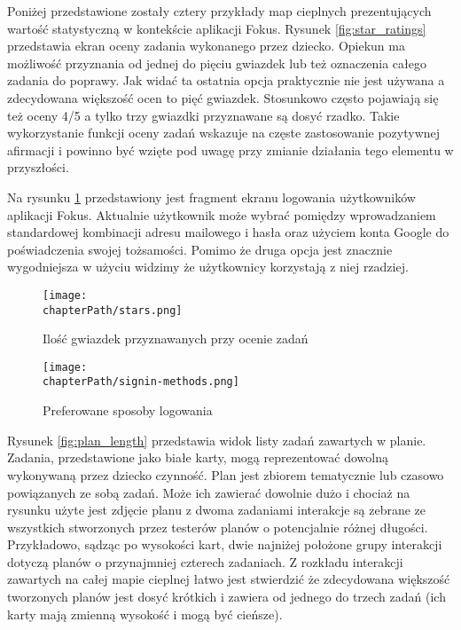Poniżej przedstawione zostały cztery przykłady map cieplnych prezentujących wartość statystyczną w kontekście aplikacji Fokus. Rysunek \ref{fig:star_ratings} przedstawia ekran oceny zadania wykonanego przez dziecko. Opiekun ma możliwość przyznania od jednej do pięciu gwiazdek lub też oznaczenia całego zadania do poprawy. Jak widać ta ostatnia opcja praktycznie nie jest używana a zdecydowana większość ocen to pięć gwiazdek. Stosunkowo często pojawiają się też oceny 4/5 a tylko trzy gwiazdki przyznawane są dosyć rzadko. Takie wykorzystanie funkcji oceny zadań wskazuje na częste zastosowanie pozytywnej afirmacji i powinno być wzięte pod uwagę przy zmianie działania tego elementu w przyszłości.

Na rysunku \ref{fig:signin_methods} przedstawiony jest fragment ekranu logowania użytkowników aplikacji Fokus. Aktualnie użytkownik może wybrać pomiędzy wprowadzaniem standardowej kombinacji adresu mailowego i hasła oraz użyciem konta Google do poświadczenia swojej tożsamości. Pomimo że druga opcja jest znacznie wygodniejsza w użyciu widzimy że użytkownicy korzystają z niej rzadziej.

\bigskip
\begin{figure}[H]
\centering
\begin{minipage}{.45\textwidth}
	\centering
	\texttt{[image: \\chapterPath/stars.png]}
	\bigskip
	\caption{Ilość gwiazdek przyznawanych przy ocenie zadań}
	\label{fig:star_ratings}
\end{minipage}
\begin{minipage}{.45\textwidth}
	\centering
	\texttt{[image: \\chapterPath/signin-methods.png]}
	\bigskip
	\caption{Preferowane sposoby logowania}
	\label{fig:signin_methods}
\end{minipage}
\end{figure}

Rysunek \ref{fig:plan_length} przedstawia widok listy zadań zawartych w planie. Zadania, przedstawione jako białe karty, mogą reprezentować dowolną wykonywaną przez dziecko czynność. Plan jest zbiorem tematycznie lub czasowo powiązanych ze sobą zadań. Może ich zawierać dowolnie dużo i chociaż na rysunku użyte jest zdjęcie planu z dwoma zadaniami interakcje są zebrane ze wszystkich stworzonych przez testerów planów o potencjalnie różnej długości. Przykładowo, sądząc po wysokości kart, dwie najniżej położone grupy interakcji dotyczą planów o przynajmniej czterech zadaniach. Z rozkładu interakcji zawartych na całej mapie cieplnej łatwo jest stwierdzić że zdecydowana większość tworzonych planów jest dosyć krótkich i zawiera od jednego do trzech zadań (ich karty mają zmienną wysokość i mogą być cieńsze).

